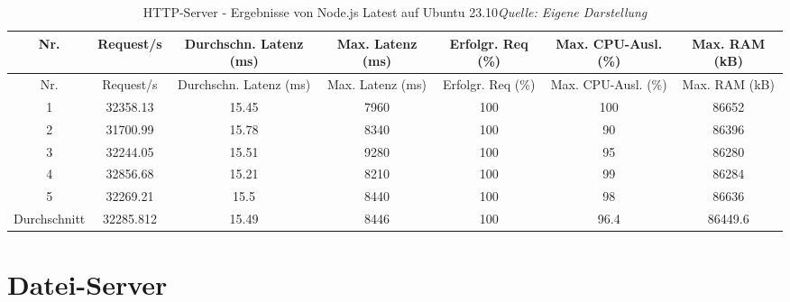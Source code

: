 	\begin{longtable}{
			c
			S[table-format=6.2]
			S[table-format=2.2]
			S[table-format=3.0]
			S[table-format=3]
			S[table-format=2.0]
			S[table-format=5.1]
		}
		\caption[HTTP-Server - Ergebnisse von Node.js Latest auf Ubuntu 23.10]{HTTP-Server - Ergebnisse von Node.js Latest auf Ubuntu 23.10\protect\linebreak\textit{Quelle: Eigene Darstellung}}
		\label{tab:http-ubuntu-nodejs-current}
		\\
		\toprule
		Nr. & {Request/s} & {Durchschn. Latenz (ms)} & {Max. Latenz (ms)} & {Erfolgr. Req (\%)} & {Max. CPU-Ausl. (\%)} & {Max. RAM (kB)} \\
		\midrule
		\endfirsthead
		\toprule
		Nr. & {Request/s} & {Durchschn. Latenz (ms)} & {Max. Latenz (ms)} & {Erfolgr. Req (\%)} & {Max. CPU-Ausl. (\%)} & {Max. RAM (kB)} \\
		\midrule
		 & 32358.13 & 15.45 & 7960 & 100 & 100 & 86652 \\
		2 & 31700.99 & 15.78 & 8340 & 100 & 90 & 86396 \\
		3 & 32244.05 & 15.51 & 9280 & 100 & 95 & 86280 \\
		4 & 32856.68 & 15.21 & 8210 & 100 & 99 & 86284 \\
		5 & 32269.21 & 15.5 & 8440 & 100 & 98 & 86636 \\
		Durchschnitt & 32285.812 & 15.49 & 8446 & 100 & 96.4 & 86449.6 \\
		\bottomrule
	\end{longtable}
	\newpage
	
	\section{Datei-Server} \label{sec:benchmark-results-file-server}
	
